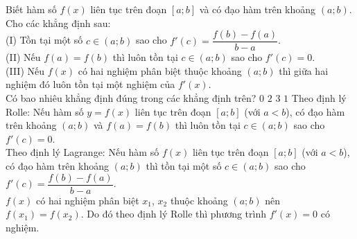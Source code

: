 \begin{ex}%
 Biết hàm số $f(x)$ liên tục trên đoạn $[a;b]$ và có đạo hàm trên khoảng $(a;b)$. Cho các khẳng định sau:\\
 (I) Tồn tại một số $c \in (a;b)$ sao cho $f'(c) = \dfrac{f(b) - f(a)}{b - a}$.\\
 (II) Nếu $f(a) = f(b)$ thì luôn tồn tại $c \in (a;b)$ sao cho $f'(c) = 0$.\\
 (III) Nếu $f(x)$ có hai nghiệm phân biệt thuộc khoảng $(a;b)$ thì giữa hai nghiệm đó luôn tồn tại một nghiệm của $f'(x)$.\\
 Có bao nhiêu khẳng định đúng trong các khẳng định trên?
 \choice
  {$0$}
  {$2$}
  {\True $3$}
  {$1$}
 \loigiai
  {
  Theo định lý Rolle: Nếu hàm số $y = f(x)$ liên tục trên đoạn $[a;b]$ (với $a<b$), có đạo hàm trên khoảng $(a;b)$ và $f(a) = f(b)$ thì luôn tồn tại $c \in (a;b)$ sao cho $f'(c) = 0$.\\
  Theo định lý Lagrange: Nếu hàm số $f(x)$ liên tục trên đoạn $[a;b]$ (với $a<b$), có đạo hàm trên khoảng $(a;b)$ thì tồn tại một số $c \in (a;b)$ sao cho $f'(c) = \dfrac{f(b) - f(a)}{b - a}$.\\
  $f(x)$ có hai nghiệm phân biệt $x_1$, $x_2$ thuộc khoảng $(a;b)$ nên $f(x_1) = f(x_2)$. Do đó theo định lý Rolle thì phương trình $f'(x) = 0$ có nghiệm.
  }
\end{ex}


